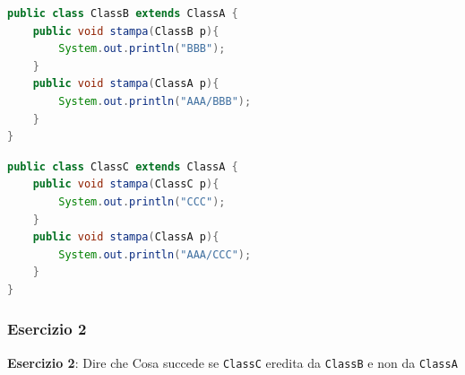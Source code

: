 \documentclass{article}
\begin{document}
\begin{lstlisting}[language=Java,escapechar=|]
public class ClassB extends ClassA {
	public void stampa(ClassB p){
		System.out.println("BBB");
	}
	public void stampa(ClassA p){
		System.out.println("AAA/BBB");
	}
}
\end{lstlisting}

\begin{lstlisting}[language=Java,escapechar=|]
public class ClassC extends ClassA {
	public void stampa(ClassC p){
		System.out.println("CCC");
	}
	public void stampa(ClassA p){
		System.out.println("AAA/CCC");
	}
}
\end{lstlisting}

\subsubsection{Esercizio 2}
\begin{framed}
\textbf{Esercizio 2}: Dire che Cosa succede se \texttt{ClassC} eredita da \texttt{ClassB} e non da \texttt{ClassA}
\end{framed}
\end{document}
